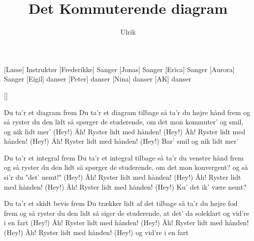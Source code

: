 \documentclass[a4paper,11pt]{article}
\title{Det Kommuterende diagram}
\author{Ulrik}
\begin{document}
\maketitle

\begin{roles}  
[Lasse] Instruktør
[Frederikke] Sanger
[Jonas] Sanger
[Erica] Sanger
[Aurora] Sanger
[Eigil] danser
[Peter] danser
[Nina] danser
[AK] danser
\end{roles}

\begin{props}  
[]
\end{props}
\begin{song}

 Du ta'r et diagram frem
Du ta'r et diagram tilbage
så ta'r du højre hånd frem og så ryster du den lidt
så spørger de studerende, om det mon kommuter'
og smil, og nik lidt mer' (Hey!)
Åh! Ryster lidt med hånden! (Hey!)
Åh! Ryster lidt med hånden! (Hey!)
Åh! Ryster lidt med hånden! (Hey!)
Bar' smil og nik lidt mer'

 Du ta'r et integral frem
Du ta'r et integral tilbage
så ta'r du venstre hånd frem og så ryster du den lidt
så spørger de studerende, om det mon konvergent?
og så si'r du "det' nemt!" (Hey!)
Åh! Ryster lidt med hånden! (Hey!)
Åh! Ryster lidt med hånden! (Hey!)
Åh! Ryster lidt med hånden! (Hey!)
Ku' det ik' være nemt?

 Du ta'r et skidt bevis frem
Du trækker lidt af det tilbage
så ta'r du højre fod frem og så ryster du den lidt
så siger de studerende, at det' da soleklart
og vid're i en fart (Hey!)
Åh! Ryster lidt med hånden! (Hey!)
Åh! Ryster lidt med hånden! (Hey!)
Åh! Ryster lidt med hånden! (Hey!)
og vid're i en fart

\end{song}
\end{document}
